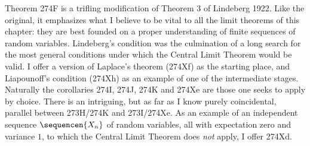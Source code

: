 {Theorem 274F is a trifling modification of Theorem 3 of
{\smc Lindeberg 1922}.   Like the original, it emphasizes what I
believe to be vital to all the limit theorems of this chapter:  they are
best founded on a proper understanding of finite sequences of random
variables.   Lindeberg's condition was the culmination of a long search
for the most general conditions under which the Central Limit Theorem
would be valid.  I offer a version of Laplace's theorem (274Xf)
as the starting place, and Liapounoff's condition (274Xh) as an example
of one of the intermediate stages.   Naturally the corollaries 274I,
274J, 274K and 274Xe are those one seeks to apply by choice.   There is
an intriguing, but as far as I know purely coincidental, parallel between
273H/274K and 273I/274Xe.   As an example of an independent sequence
$\sequencen{X_n}$ of random variables, all with expectation zero and
variance $1$, to which the Central Limit Theorem does {\it not} apply, I
offer 274Xd.
}%

\discrpage

